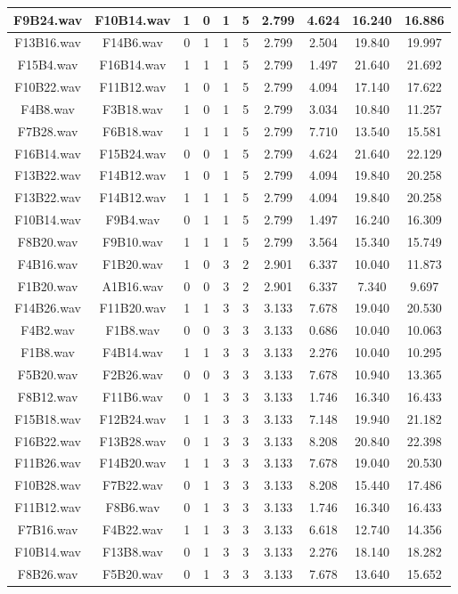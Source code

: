 \documentclass[11pt,a4paper]{book}
\begin{document}
\begin{longtable}[c]{|c|c|c|c|c|c|c|c|c|c|}
F9B24.wav&F10B14.wav&1&0&1&5&2.799&4.624&16.240&16.886\\ \hline
F13B16.wav&F14B6.wav&0&1&1&5&2.799&2.504&19.840&19.997\\ \hline
F15B4.wav&F16B14.wav&1&1&1&5&2.799&1.497&21.640&21.692\\ \hline
F10B22.wav&F11B12.wav&1&0&1&5&2.799&4.094&17.140&17.622\\ \hline
F4B8.wav&F3B18.wav&1&0&1&5&2.799&3.034&10.840&11.257\\ \hline
F7B28.wav&F6B18.wav&1&1&1&5&2.799&7.710&13.540&15.581\\ \hline
F16B14.wav&F15B24.wav&0&0&1&5&2.799&4.624&21.640&22.129\\ \hline
F13B22.wav&F14B12.wav&1&0&1&5&2.799&4.094&19.840&20.258\\ \hline
F13B22.wav&F14B12.wav&1&1&1&5&2.799&4.094&19.840&20.258\\ \hline
F10B14.wav&F9B4.wav&0&1&1&5&2.799&1.497&16.240&16.309\\ \hline
F8B20.wav&F9B10.wav&1&1&1&5&2.799&3.564&15.340&15.749\\ \hline
F4B16.wav&F1B20.wav&1&0&3&2&2.901&6.337&10.040&11.873\\ \hline
F1B20.wav&A1B16.wav&0&0&3&2&2.901&6.337&7.340&9.697\\ \hline
F14B26.wav&F11B20.wav&1&1&3&3&3.133&7.678&19.040&20.530\\ \hline
F4B2.wav&F1B8.wav&0&0&3&3&3.133&0.686&10.040&10.063\\ \hline
F1B8.wav&F4B14.wav&1&1&3&3&3.133&2.276&10.040&10.295\\ \hline
F5B20.wav&F2B26.wav&0&0&3&3&3.133&7.678&10.940&13.365\\ \hline
F8B12.wav&F11B6.wav&0&1&3&3&3.133&1.746&16.340&16.433\\ \hline
F15B18.wav&F12B24.wav&1&1&3&3&3.133&7.148&19.940&21.182\\ \hline
F16B22.wav&F13B28.wav&0&1&3&3&3.133&8.208&20.840&22.398\\ \hline
F11B26.wav&F14B20.wav&1&1&3&3&3.133&7.678&19.040&20.530\\ \hline
F10B28.wav&F7B22.wav&0&1&3&3&3.133&8.208&15.440&17.486\\ \hline
F11B12.wav&F8B6.wav&0&1&3&3&3.133&1.746&16.340&16.433\\ \hline
F7B16.wav&F4B22.wav&1&1&3&3&3.133&6.618&12.740&14.356\\ \hline
F10B14.wav&F13B8.wav&0&1&3&3&3.133&2.276&18.140&18.282\\ \hline
F8B26.wav&F5B20.wav&0&1&3&3&3.133&7.678&13.640&15.652\\ \hline

\end{longtable}
\end{document}

